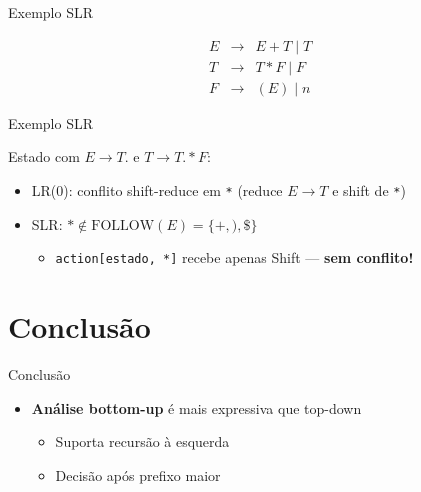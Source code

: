 \begin{frame}{Exemplo SLR}

    \[\begin{array}{lcl}
    E &\to& E + T \mid T \\
    T &\to& T * F \mid F \\
    F &\to& (E) \mid n
\end{array}\]
\end{frame}

\begin{frame}[fragile]{Exemplo SLR}

    Estado com \(E \to T.\) e \(T \to T . * F\):

    \begin{itemize}

        \item
        LR(0): conflito shift-reduce em \texttt{*} (reduce
        \(E \to T\) e shift de \texttt{*})
        \item
        SLR: \(* \notin \mathrm{FOLLOW}(E) = \{+, ), \$\}\)

        \begin{itemize}

            \item
            \texttt{action[estado, *]} recebe apenas Shift ---
            \textbf{sem conflito!}
        \end{itemize}
    \end{itemize}
\end{frame}


\section{Conclusão}\label{conclusuxe3o}

\begin{frame}{Conclusão}

    \begin{itemize}

        \item
        \textbf{Análise bottom-up} é mais expressiva que top-down

        \begin{itemize}

            \item
            Suporta recursão à esquerda
            \item
            Decisão após prefixo maior
        \end{itemize}
    \end{itemize}
\end{frame}

